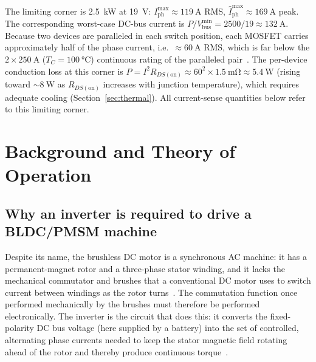 \documentclass[journal,onecolumn,11pt]{IEEEtran}
\newcommand{\Vbus}{V_{\mathrm{bus}}}
\newcommand{\Iph}{I_{\mathrm{ph}}}
\newcommand{\Rdson}{R_{DS(\mathrm{on})}}
\begin{document}
The limiting corner is \SI{2.5}{\kilo\watt} at \SI{19}{\volt}: $\Iph^{\max}\approx\SI{119}{\ampere}$
RMS, $\hat I_{\mathrm{ph}}^{\max}\approx\SI{169}{\ampere}$ peak. The corresponding worst-case DC-bus
current is $P/\Vbus^{\min}=2500/19\approx\SI{132}{\ampere}$. Because two devices are paralleled in
each switch position, each MOSFET carries approximately half of the phase current, i.e.\
$\approx\SI{60}{\ampere}$ RMS, which is far below the $2\times\SI{250}{\ampere}$ ($T_C=\SI{100}{\celsius}$)
continuous rating of the paralleled pair~\cite{ipt015ds}. The per-device conduction loss at this
corner is $P=I^2\Rdson\approx 60^2\times\SI{1.5}{\milli\ohm}\approx\SI{5.4}{\watt}$ (rising toward
$\sim\SI{8}{\watt}$ as $\Rdson$ increases with junction temperature), which requires adequate
cooling (Section~\ref{sec:thermal}). All current-sense quantities below refer to this limiting
corner.

\section{Background and Theory of Operation}\label{sec:why}

\subsection{Why an inverter is required to drive a BLDC/PMSM machine}
Despite its name, the brushless DC motor is a synchronous AC machine: it has a permanent-magnet
rotor and a three-phase stator winding, and it lacks the mechanical commutator and brushes that a
conventional DC motor uses to switch current between windings as the rotor turns~\cite{ti_foc}.
The commutation function once performed mechanically by the brushes must therefore be performed
electronically. The inverter is the circuit that does this: it converts the fixed-polarity DC bus
voltage (here supplied by a battery) into the set of controlled, alternating phase currents needed
to keep the stator magnetic field rotating ahead of the rotor and thereby produce continuous
torque~\cite{ti_foc}.
\end{document}
